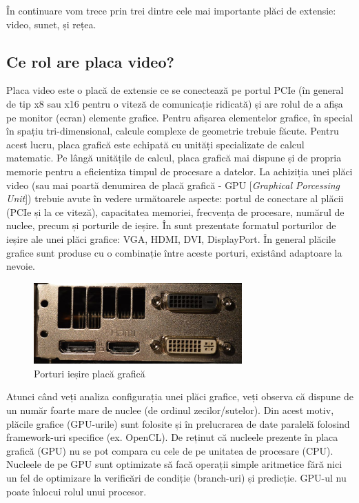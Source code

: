 În continuare vom trece prin trei dintre cele mai importante plăci de extensie:
video, sunet, și rețea.


\subsection{Ce rol are placa video?}
\label{sec:hardware-extensii-gpu}

Placa video este o placă de extensie ce se conectează pe portul PCIe (în general
de tip x8 sau x16 pentru o viteză de comunicație ridicată) și are rolul de a
afișa pe monitor (ecran) elemente grafice. Pentru afișarea elementelor grafice,
în special în spațiu tri-dimensional, calcule complexe de geometrie trebuie
făcute. Pentru acest lucru, placa grafică este echipată cu unități specializate
de calcul matematic. Pe lângă unitățile de calcul, placa grafică mai dispune și
de propria memorie pentru a eficientiza timpul de procesare a datelor. La
achiziția unei plăci video (sau mai poartă denumirea de placă grafică - GPU
[\textit{Graphical Porcessing Unit}]) trebuie avute în vedere următoarele
aspecte: portul de conectare al plăcii (PCIe și la ce viteză), capacitatea
memoriei, frecvența de procesare, numărul de nuclee, precum și porturile de
ieșire. În  sunt prezentate formatul
porturilor de ieșire ale unei plăci grafice: VGA, HDMI, DVI, DisplayPort. În
general plăcile grafice sunt produse cu o combinație între aceste porturi,
existând adaptoare la nevoie.

\begin{figure}[!htbp]
	\centering
	\includegraphics[width=8cm]{chapters/08-hw/img/gpu-img.png}
	\caption{Porturi ieșire placă grafică\protect\footnotemark}
	\label{fig:hw-gpu}
\end{figure}


Atunci când veți analiza configurația unei plăci grafice, veți observa că
dispune de un număr foarte mare de nuclee (de ordinul zecilor/sutelor). Din
acest motiv, plăcile grafice (GPU-urile) sunt folosite și în prelucrarea de date
paralelă folosind framework-uri specifice (ex. OpenCL). De reținut că nucleele
prezente în placa grafică (GPU) nu se pot compara cu cele de pe unitatea de
procesare (CPU). Nucleele de pe GPU sunt optimizate să facă operații simple
aritmetice fără nici un fel de optimizare la verificări de condiție (branch-uri)
și predicție. GPU-ul nu poate înlocui rolul unui procesor.

